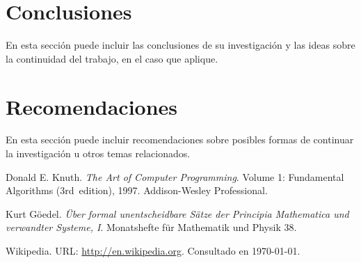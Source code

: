 \documentclass[a4paper,10pt,twocolumn]{article}
\begin{document}



\section{Conclusiones}\label{sec:conc}

  En esta sección puede incluir las conclusiones de su investigación y las ideas
  sobre la continuidad del trabajo, en el caso que aplique.




\section{Recomendaciones}\label{sec:rec}

  En esta sección puede incluir recomendaciones sobre posibles formas de continuar
  la investigación u otros temas relacionados.




\begin{thebibliography}{99}
	 Donald E. Knuth. \emph{The Art of Computer Programming}.
		Volume 1: Fundamental Algorithms (3rd~edition), 1997.
		Addison-Wesley Professional.

	 Kurt Göedel. \emph{Über formal unentscheidbare Sätze der
		Principia Mathematica und verwandter Systeme, I}.
		Monatshefte für Mathematik und Physik 38.

	 Wikipedia. URL: \href{http://en.wikipedia.org}
	  {http://en.wikipedia.org}.
		Consultado en \today.

\end{thebibliography}


\label{end}
\end{document}

